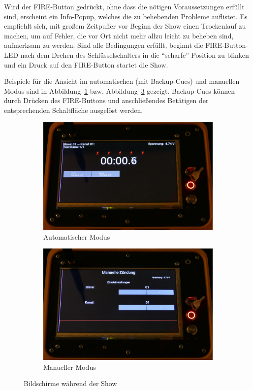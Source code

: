 \documentclass[paper=a4, parskip, numbers=noenddot, toc=listof, headsepline]{scrbook}
\begin{document}
				Wird der FIRE-Button gedrückt, ohne dass die nötigen Voraussetzungen erfüllt sind, erscheint ein Info-Popup, welches die zu behebenden Probleme auflistet. Es empfiehlt sich, mit großem Zeitpuffer vor Beginn der Show einen Trockenlauf zu machen, um auf Fehler, die vor Ort nicht mehr allzu leicht zu beheben sind, aufmerksam zu werden. Sind alle Bedingungen erfüllt, beginnt die FIRE-Button-LED nach dem Drehen des Schlüsselschalters in die \enquote{scharfe} Position zu blinken und ein Druck auf den FIRE-Button startet die Show.

				Beispiele für die Ansicht im automatischen (mit Backup-Cues) und manuellen Modus sind in Abbildung~\ref{fig:REFauto} bzw. Abbildung~\ref{fig:REFmanual} gezeigt. Backup-Cues können durch Drücken des FIRE-Buttons und anschließendes Betätigen der entsprechenden Schaltfläche ausgelöst werden.

				\begin{figure}
					\begin{subfigure}{\textwidth}
						\includegraphics{Bilder/REFautoshow}
						\caption{Automatischer Modus}
						\label{fig:REFauto}
					\end{subfigure}
					\newline
					\begin{subfigure}{\textwidth}
						\includegraphics{Bilder/REFmanualshow}
						\caption{Manueller Modus}
						\label{fig:REFmanual}
					\end{subfigure}
					\caption{Bildschirme während der Show}
				\end{figure}
\end{document}
